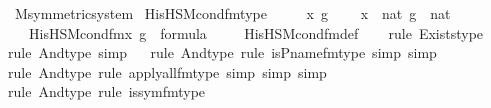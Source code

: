 \begin{isabellebody}
\isanewline
\isanewline
{}\isamarkupfalse%
\ M{\isacharunderscore}{\kern0pt}symmetric{\isacharunderscore}{\kern0pt}system\isanewline
{}\isanewline
\isanewline
{}\isamarkupfalse%
\ His{\isacharunderscore}{\kern0pt}HS{\isacharunderscore}{\kern0pt}M{\isacharunderscore}{\kern0pt}cond{\isacharunderscore}{\kern0pt}fm{\isacharunderscore}{\kern0pt}type\ {\isacharcolon}{\kern0pt}\ \isanewline
\ \ \ x{\isacharprime}{\kern0pt}\ g\ \isanewline
\ \ \ {\isachardoublequoteopen}x{\isacharprime}{\kern0pt}\ {\isasymin}\ nat{\isachardoublequoteclose}\ {\isachardoublequoteopen}g\ {\isasymin}\ nat{\isachardoublequoteclose}\ \isanewline
\ \ \ {\isachardoublequoteopen}His{\isacharunderscore}{\kern0pt}HS{\isacharunderscore}{\kern0pt}M{\isacharunderscore}{\kern0pt}cond{\isacharunderscore}{\kern0pt}fm{\isacharparenleft}{\kern0pt}x{\isacharprime}{\kern0pt}{\isacharcomma}{\kern0pt}\ g{\isacharparenright}{\kern0pt}\ {\isasymin}\ formula{\isachardoublequoteclose}\ \isanewline
%
\isadelimproof
\isanewline
\ \ %
\endisadelimproof
%
\isatagproof
{}\isamarkupfalse%
\ His{\isacharunderscore}{\kern0pt}HS{\isacharunderscore}{\kern0pt}M{\isacharunderscore}{\kern0pt}cond{\isacharunderscore}{\kern0pt}fm{\isacharunderscore}{\kern0pt}def\isanewline
\ \ \isamarkupfalse%
\ {\isacharparenleft}{\kern0pt}rule\ Exists{\isacharunderscore}{\kern0pt}type{\isacharparenright}{\kern0pt}{\isacharplus}{\kern0pt}\isanewline
\ \ \isamarkupfalse%
{\isacharparenleft}{\kern0pt}rule\ And{\isacharunderscore}{\kern0pt}type{\isacharcomma}{\kern0pt}\ simp{\isacharparenright}{\kern0pt}{\isacharplus}{\kern0pt}\isanewline
\ \ \isamarkupfalse%
{\isacharparenleft}{\kern0pt}rule\ And{\isacharunderscore}{\kern0pt}type{\isacharcomma}{\kern0pt}\ rule\ is{\isacharunderscore}{\kern0pt}P{\isacharunderscore}{\kern0pt}name{\isacharunderscore}{\kern0pt}fm{\isacharunderscore}{\kern0pt}type{\isacharcomma}{\kern0pt}\ simp{\isacharcomma}{\kern0pt}\ simp{\isacharparenright}{\kern0pt}\isanewline
\ \ \ \isamarkupfalse%
{\isacharparenleft}{\kern0pt}rule\ And{\isacharunderscore}{\kern0pt}type{\isacharcomma}{\kern0pt}\ rule\ apply{\isacharunderscore}{\kern0pt}all{\isacharunderscore}{\kern0pt}{}{\isacharunderscore}{\kern0pt}fm{\isacharunderscore}{\kern0pt}type{\isacharcomma}{\kern0pt}\ simp{\isacharcomma}{\kern0pt}\ simp{\isacharcomma}{\kern0pt}\ simp{\isacharparenright}{\kern0pt}\isanewline
\ \ \isamarkupfalse%
{\isacharparenleft}{\kern0pt}rule\ And{\isacharunderscore}{\kern0pt}type{\isacharcomma}{\kern0pt}\ rule\ is{\isacharunderscore}{\kern0pt}sym{\isacharunderscore}{\kern0pt}fm{\isacharunderscore}{\kern0pt}type{\isacharparenright}{\kern0pt}\isanewline

\end{isabellebody}
